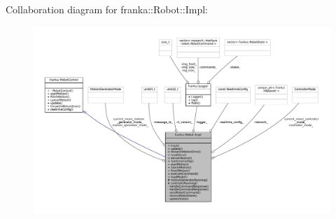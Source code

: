 Collaboration diagram for franka\+:\+:Robot\+:\+:Impl\+:
\nopagebreak
\begin{figure}[H]
\begin{center}
\leavevmode
\includegraphics[width=350pt]{classfranka_1_1Robot_1_1Impl__coll__graph}
\end{center}
\end{figure}
